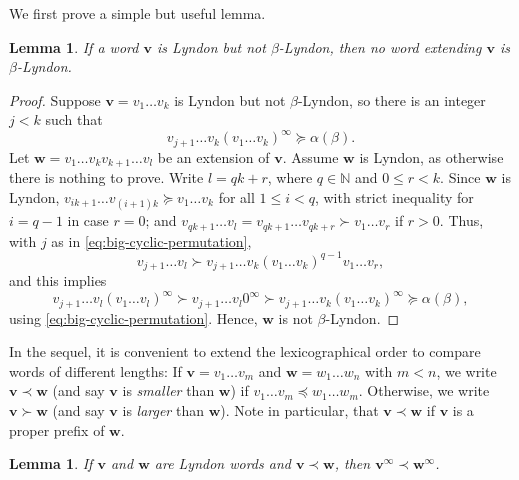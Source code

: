 \documentclass[11pt]{amsart}
\newtheorem{lemma}[theorem]{Lemma}
\theoremstyle{definition}
\theoremstyle{remark}
\numberwithin{equation}{section}
\newcommand{\N}{\ensuremath{\mathbb{N}}}
\renewcommand{\v}{\mathbf{v}}
\newcommand{\w}{\mathbf{w}}
\newcommand{\f}{\infty}
\newcommand{\al}{\alpha}
\newcommand{\lle}{\preccurlyeq}
\newcommand{\lge}{\succcurlyeq}
\begin{document}
We first prove a simple but useful lemma.

\begin{lemma} \label{lem:no-beta-Lyndon-extension}
If a word $\v$ is Lyndon but not $\beta$-Lyndon, then no word extending $\v$ is $\beta$-Lyndon.
\end{lemma}

\begin{proof}
Suppose $\v=v_1\dots v_k$ is Lyndon but not $\beta$-Lyndon, so there is an integer $j<k$ such that
\begin{equation} \label{eq:big-cyclic-permutation}
{v_{j+1}\dots v_k (v_1\dots v_k)^\f\lge \al(\beta).}
\end{equation}
Let $\w=v_1\dots v_k v_{k+1}\dots v_l$ be an extension of $\v$. Assume $\w$ is Lyndon, as otherwise there is nothing to prove. Write $l=qk+r$, where $q\in\N$ and $0\leq r<k$. Since $\w$ is Lyndon, $v_{ik+1}\dots v_{(i+1)k}\lge v_1\dots v_k$ for all $1\leq i<q$, with strict inequality for $i=q-1$ in case $r=0$; and $v_{qk+1}\dots v_l=v_{qk+1}\dots v_{qk+r}\succ v_1\dots v_r$ if $r>0$. Thus, with $j$ as in \eqref{eq:big-cyclic-permutation},
\begin{equation*} %
v_{j+1}\dots v_l\succ v_{j+1}\dots v_k(v_1\dots v_k)^{q-1}v_1\dots v_r,
\end{equation*}
{and this implies
\[
v_{j+1}\dots v_l (v_1\dots v_l)^\f\succ v_{j+1}\dots v_l 0^\f\succ v_{j+1}\dots v_k (v_1\dots v_k)^\f\lge \al(\beta),
\]
using \eqref{eq:big-cyclic-permutation}. Hence, $\w$ is not $\beta$-Lyndon.}
\end{proof}

In the sequel, it is convenient to extend the lexicographical order to compare words of different lengths: If $\v=v_1\dots v_m$ and $\w=w_1\dots w_n$ with $m<n$, we write $\v\prec\w$ (and say $\v$ is {\em smaller} than $\w$) if $v_1\dots v_m\lle w_1\dots w_m$. Otherwise, we write $\v\succ\w$ (and say $\v$ is {\em larger} than $\w$). Note in particular, that $\v\prec\w$ if $\v$ is a proper prefix of $\w$.

\begin{lemma} \label{lem:repeating-preserves-order}
If $\v$ and $\w$ are Lyndon words and $\v\prec\w$, then $\v^\f\prec \w^\f$.
\end{lemma}
\end{document}
